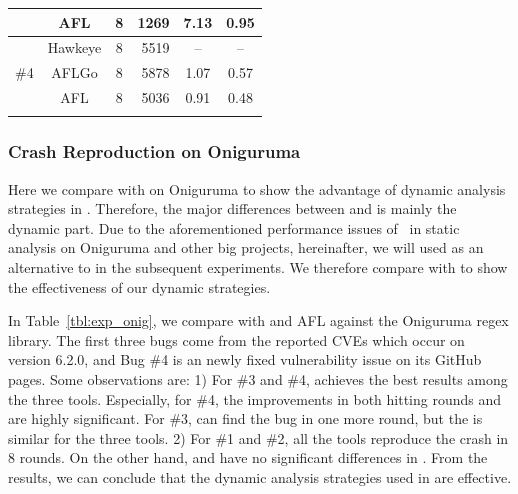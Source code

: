 \begin{table}[t]
\begin{tabular}{c|c|c|r|c|c}
        &        AFL   &            8                                          &                         1269                            &                     7.13                   &              0.95          \\ \hline
        \multirow{3}{*}{\#4}  & Hawkeye &      8                                                &                 5519                                    &              --                         & --                         \\ \cline{2-6} 
        &       AFLGo  &                8                                      &                 5878                                    &             1.07                                 &    0.57              \\ \cline{2-6} 
        &       AFL   &             8                                         &                 5036                                    &             0.91                              &    0.48                 \\ \thickhline          
    \end{tabular}  
\end{table}

\subsubsection{Crash Reproduction on Oniguruma}

Here we compare \dFOT with \dGO on Oniguruma to show the advantage of dynamic analysis strategies in \dFOT.
Therefore, the major differences between {\dFOT} and {\dGO} is mainly the dynamic part.
Due to the aforementioned performance issues of \aflgo~in static analysis on Oniguruma and other big projects, hereinafter, we will used \dGO as an alternative	to \aflgo in the subsequent experiments.
We therefore compare {\dFOT} with {\dGO} to show the effectiveness of our dynamic strategies.

In Table~\ref{tbl:exp_onig}, we compare \dFOT with \dGO and AFL against the Oniguruma regex library. The first three bugs come from the reported CVEs which occur on version 6.2.0, and Bug \#4 is an newly fixed vulnerability issue on its GitHub pages.
Some observations are: 
1) For \#3 and \#4,  \dFOT achieves the best results among the three tools. 
Especially, for \#4, the improvements in both hitting rounds and  {\utte} are highly significant. 
For \#3, \dFOT can find the bug in one more round, but the {\utte} is similar for the three tools.
2) For \#1 and \#2,  all the tools reproduce the crash in 8 rounds. On the other hand, \dFOT and \dGO have no significant differences in {\utte}.
From the results, we can conclude that the dynamic analysis strategies used in \dFOT are effective.







